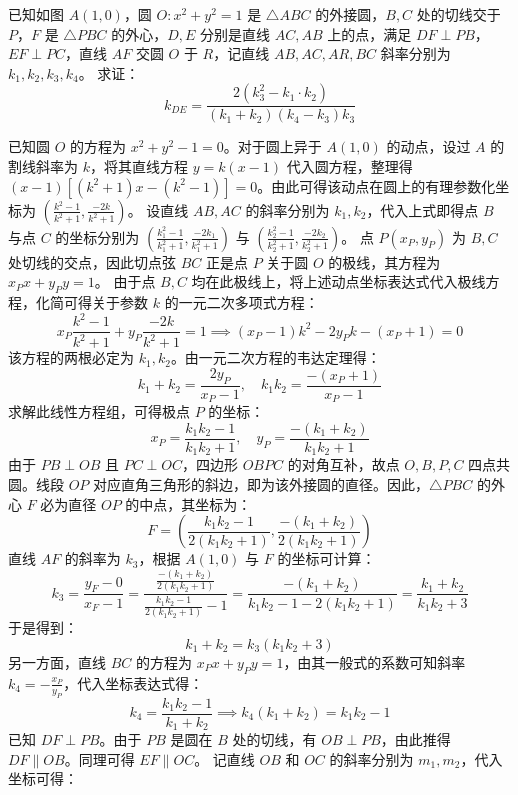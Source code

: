 \begin{exercise}
已知如图 \(A(1,0)\)，圆 \(O: x^2 + y^2 = 1\) 是 \(\triangle ABC\) 的外接圆，\(B,C\) 处的切线交于 \(P\)，\(F\) 是 \(\triangle PBC\) 的外心，\(D,E\) 分别是直线 \(AC,AB\) 上的点，满足 \(DF \perp PB\)，\(EF \perp PC\)，直线 \(AF\) 交圆 \(O\) 于 \(R\)，记直线 \(AB,AC,AR,BC\) 斜率分别为 \(k_1,k_2,k_3,k_4\)。
求证：\[k_{DE} = \frac{2\left(k_3^2 - k_1 \cdot k_2\right)}{\left(k_1 + k_2\right)\left(k_4 - k_3\right)k_3}\]
\end{exercise}
\begin{solution}
已知圆 $O$ 的方程为 $x^2+y^2-1 = 0$。对于圆上异于 $A(1,0)$ 的动点，设过 $A$ 的割线斜率为 $k$，将其直线方程 $y = k(x-1)$ 代入圆方程，整理得 $(x-1)[(k^2+1)x - (k^2-1)] = 0$。由此可得该动点在圆上的有理参数化坐标为 $\left( \frac{k^2-1}{k^2+1}, \frac{-2k}{k^2+1} \right)$。
设直线 $AB, AC$ 的斜率分别为 $k_1, k_2$，代入上式即得点 $B$ 与点 $C$ 的坐标分别为 $\left( \frac{k_1^2-1}{k_1^2+1}, \frac{-2k_1}{k_1^2+1} \right)$ 与 $\left( \frac{k_2^2-1}{k_2^2+1}, \frac{-2k_2}{k_2^2+1} \right)$。
点 $P(x_P,y_P)$ 为 $B,C$ 处切线的交点，因此切点弦 $BC$ 正是点 $P$ 关于圆 $O$ 的极线，其方程为 $x_P x + y_P y = 1$。
由于点 $B,C$ 均在此极线上，将上述动点坐标表达式代入极线方程，化简可得关于参数 $k$ 的一元二次多项式方程：
\[ x_P \frac{k^2-1}{k^2+1} + y_P \frac{-2k}{k^2+1} = 1 \implies (x_P-1)k^2 - 2y_P k - (x_P+1) = 0 \]
该方程的两根必定为 $k_1, k_2$。由一元二次方程的韦达定理得：
\[ k_1+k_2 = \frac{2y_P}{x_P-1}, \quad k_1 k_2 = \frac{-(x_P+1)}{x_P-1} \]
求解此线性方程组，可得极点 $P$ 的坐标：
\[ x_P = \frac{k_1 k_2 - 1}{k_1 k_2 + 1}, \quad y_P = \frac{-(k_1+k_2)}{k_1 k_2 + 1} \]
由于 $PB \perp OB$ 且 $PC \perp OC$，四边形 $OBPC$ 的对角互补，故点 $O, B, P, C$ 四点共圆。线段 $OP$ 对应直角三角形的斜边，即为该外接圆的直径。因此，$\triangle PBC$ 的外心 $F$ 必为直径 $OP$ 的中点，其坐标为：
\[ F = \left( \frac{k_1 k_2 - 1}{2(k_1 k_2 + 1)}, \frac{-(k_1+k_2)}{2(k_1 k_2 + 1)} \right) \]
直线 $AF$ 的斜率为 $k_3$，根据 $A(1,0)$ 与 $F$ 的坐标可计算：
\[ k_3 = \frac{y_F - 0}{x_F - 1} = \frac{\frac{-(k_1+k_2)}{2(k_1 k_2 + 1)}}{\frac{k_1 k_2 - 1}{2(k_1 k_2 + 1)} - 1} = \frac{-(k_1+k_2)}{k_1 k_2 - 1 - 2(k_1 k_2 + 1)} = \frac{k_1+k_2}{k_1 k_2 + 3} \]
于是得到：
\[ k_1+k_2 = k_3(k_1 k_2 + 3) \]
另一方面，直线 $BC$ 的方程为 $x_P x + y_P y = 1$，由其一般式的系数可知斜率 $k_4 = -\frac{x_P}{y_P}$，代入坐标表达式得：
\[ k_4 = \frac{k_1 k_2 - 1}{k_1+k_2} \implies k_4(k_1+k_2) = k_1 k_2 - 1 \]
已知 $DF \perp PB$。由于 $PB$ 是圆在 $B$ 处的切线，有 $OB \perp PB$，由此推得 $DF \parallel OB$。同理可得 $EF \parallel OC$。
记直线 $OB$ 和 $OC$ 的斜率分别为 $m_1, m_2$，代入坐标可得：

\end{solution}
